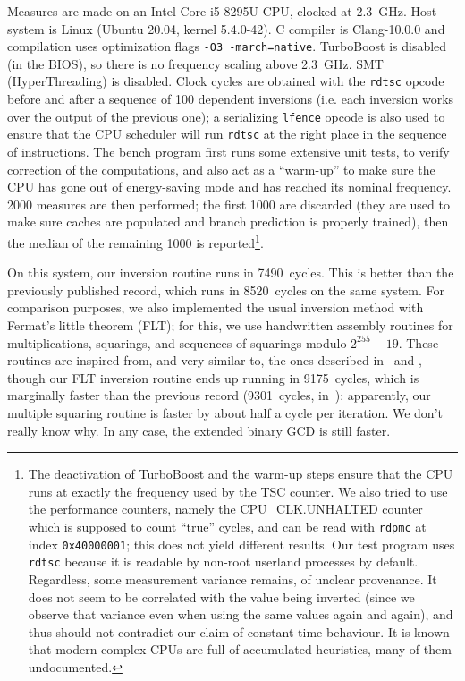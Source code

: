 \documentclass{llncs}
\begin{document}
Measures are made on an Intel Core i5-8295U CPU, clocked at 2.3~GHz.
Host system is Linux (Ubuntu 20.04, kernel 5.4.0-42). C compiler is
Clang-10.0.0 and compilation uses optimization flags
\verb+-O3 -march=native+. TurboBoost is disabled (in the BIOS), so there
is no frequency scaling above 2.3~GHz. SMT (HyperThreading) is disabled.
Clock cycles are obtained with the \verb+rdtsc+ opcode before and after
a sequence of 100 dependent inversions (i.e. each inversion works over
the output of the previous one); a serializing \verb+lfence+ opcode is
also used to ensure that the CPU scheduler will run \verb+rdtsc+ at the
right place in the sequence of instructions. The bench program first
runs some extensive unit tests, to verify correction of the
computations, and also act as a ``warm-up'' to make sure the CPU has
gone out of energy-saving mode and has reached its nominal frequency.
2000 measures are then performed; the first 1000 are discarded (they are
used to make sure caches are populated and branch prediction is properly
trained), then the median of the remaining 1000 is reported\footnote{The
deactivation of TurboBoost and the warm-up steps ensure that the CPU
runs at exactly the frequency used by the TSC counter. We also tried to
use the performance counters, namely the CPU\_CLK.UNHALTED counter which
is supposed to count ``true'' cycles, and can be read with
\texttt{rdpmc} at index \texttt{0x40000001}; this does not yield
different results. Our test program uses \texttt{rdtsc} because it is
readable by non-root userland processes by default. Regardless, some
measurement variance remains, of unclear provenance. It does not seem to
be correlated with the value being inverted (since we observe that
variance even when using the same values again and again), and thus
should not contradict our claim of constant-time behaviour. It is known
that modern complex CPUs are full of accumulated heuristics, many of them
undocumented.}.

On this system, our inversion routine runs in 7490~cycles. This is
better than the previously published record\cite{BerYan2019}, which runs
in 8520~cycles on the same system. For comparison purposes, we also
implemented the usual inversion method with Fermat's little theorem
(FLT); for this, we use handwritten assembly routines for
multiplications, squarings, and sequences of squarings modulo
$2^{255}-19$. These routines are inspired from, and very similar to, the
ones described in~\cite{OliLopHisFazRod2017} and \cite{NatSar2018},
though our FLT inversion routine ends up running in 9175~cycles, which
is marginally faster than the previous record (9301~cycles,
in~\cite{NatSar2018}): apparently, our multiple squaring routine is
faster by about half a cycle per iteration. We don't really know why. In
any case, the extended binary GCD is still faster.
\end{document}
